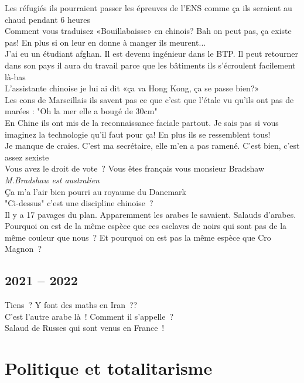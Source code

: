 \documentclass[french, a4paper, openany]{book}
\begin{document}
	\noindent \og Les réfugiés ils pourraient passer les épreuves de l'ENS comme ça ils seraient au chaud pendant 6 heures \fg \\
	\og Comment vous traduisez «Bouillabaisse» en chinois? Bah on peut pas, ça existe pas! En plus si on leur en donne à manger ils meurent... \fg \\
	\og J'ai eu un étudiant afghan. Il est devenu ingénieur dans le BTP. Il peut retourner dans son pays il aura du travail parce que les bâtiments ils s'écroulent facilement là-bas \fg \\
	\og L'assistante chinoise je lui ai dit «ça va Hong Kong, ça se passe bien?» \fg \\
	\og Les cons de Marseillais ils savent pas ce que c'est que l'étale vu qu'ils ont pas de marées : "Oh la mer elle a bougé de 30cm" \fg \\
	\og En Chine ils ont mis de la reconnaissance faciale partout. Je sais pas si vous imaginez la technologie qu'il faut pour ça! En plus ils se ressemblent tous! \fg \\
	\og Je manque de craies. C'est ma secrétaire, elle m'en a pas ramené. C'est bien, c'est assez sexiste \fg \\
	\og Vous avez le droit de vote~? Vous êtes français vous monsieur Bradshaw \fg \emph{M.Bradshaw est australien} \\
	\og Ça m'a l'air bien pourri au royaume du Danemark \fg \\
	\og "Ci-dessus" c'est une discipline chinoise~? \fg \\
	\og Il y a 17 pavages du plan. Apparemment les arabes le savaient. Salauds d'arabes. \fg \\
	\og Pourquoi on est de la même espèce que ces esclaves de noirs qui sont pas de la même couleur que nous~? Et pourquoi on est pas la même espèce que Cro Magnon~? \fg \\

	\subsection*{2021 -- 2022}
	
	\og Tiens~? Y font des maths en Iran~?? \fg \\
	\og C'est l'autre arabe là~! Comment il s'appelle~? \fg \\
	\og Salaud de Russes qui sont venus en France~! \fg \\

\section*{Politique et totalitarisme}
\end{document}
